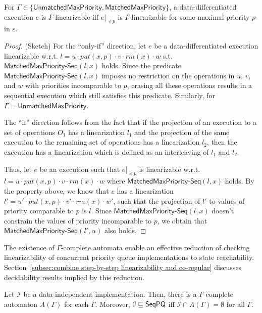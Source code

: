 \documentclass[a4paper,UKenglish]{lipics-v2016}
\begin{document}
\begin{lemma}
\label{lemma:pri execution is enough}
For $\Gamma\in \{\mathsf{UnmatchedMaxPriority}, \mathsf{MatchedMaxPriority}\}$, a data-differentiated execution $e$ 
 is $\Gamma$-linearizable iff $e\vert_{\preceq p}$ is $\Gamma$-linearizable for some maximal priority $p$ in $e$.
\end{lemma}
\begin {proof} (Sketch)
For the ``only-if'' direction, let $e$ be a data-differentiated execution linearizable w.r.t. $l = u \cdot \textit{put}(x,p) \cdot v \cdot \textit{rm}(x) \cdot w$ s.t. $\mathsf{MatchedMaxPriority}\mathsf{\text{-}Seq}(l,x)$ holds. Since the predicate $\mathsf{MatchedMaxPriority}\mathsf{\text{-}Seq}(l,x)$ imposes no restriction on the operations in $u$, $v$, and $w$ with priorities incomparable to $p$, erasing all these operations results in a sequential execution which still satisfies this predicate. Similarly, for $\Gamma=\mathsf{UnmatchedMaxPriority}$.

The ``if'' direction follows from the fact that if the projection of an execution to a set of operations $O_1$ has a linearization $l_1$ and the projection of the same execution to the remaining set of operations has a linearization $l_2$, then the execution has a linearization which is defined as an interleaving of $l_1$ and $l_2$. 

Thus, let $e$ be an execution such that $e\vert_{\preceq p}$ is linearizable w.r.t. $l = u \cdot \textit{put}(x,p) \cdot v \cdot \textit{rm}(x) \cdot w$ where $\mathsf{MatchedMaxPriority}\mathsf{\text{-}Seq}(l,x)$ holds. By the property above, we know that $e$ has a linearization $l' = u' \cdot \textit{put}(x,p) \cdot v' \cdot \textit{rm}(x) \cdot w'$, such that the projection of $l'$ to values of priority comparable to $p$ is $l$.
Since $\mathsf{MatchedMaxPriority}\mathsf{\text{-}Seq}(l,x)$ doesn't constrain the values of priority incomparable to $p$, we obtain that $\mathsf{MatchedMaxPriority}\mathsf{\text{-}Seq}(l',\alpha)$ also holds.
\end {proof}

The existence of $\Gamma$-complete automata enable an effective reduction of checking linearizability of concurrent priority queue implementations to state reachability. 
Section~\ref{subsec:combine step-by-step linearizability and co-regular} discusses decidability results implied by this reduction.

\begin{theorem}
\label{lemma:reduce EPQ into state reachability}
Let $\mathcal{I}$ be a data-independent implementation. Then, there is a $\Gamma$-complete automaton $A(\Gamma)$ for each $\Gamma$. Moreover,
$\mathcal{I} \sqsubseteq \mathsf{SeqPQ}$ iff $\mathcal{I} \cap A(\Gamma) = \emptyset$ for all $\Gamma$.
\end{theorem}
\end{document}
